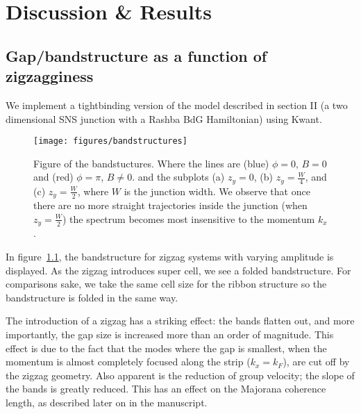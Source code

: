 \chapter{Discussion \& Results}
	
	\section{Gap/bandstructure as a function of zigzagginess}
		We implement a tightbinding version of the model described in section II (a two dimensional SNS junction with a Rashba BdG Hamiltonian) using Kwant.

		\begin{figure}[!htb]
		\texttt{[image: figures/bandstructures]}
		\caption{Figure of the bandstuctures.
		Where the lines are (blue) $\phi=0$, $B=0$ and (red) $\phi=\pi$, $B \ne 0$.
		and the subplots (a) $z_y=0$, (b) $z_y=\frac{W}{4}$, and (c) $z_y=\frac{W}{2}$, where $W$ is the junction width.
		We observe that once there are no more straight trajectories inside the junction (when $z_y=\frac{W}{2}$) the spectrum becomes most insensitive to the momentum $k_x$.
		\label{fig:bandstuctures}}
		\end{figure}

		In figure~\ref{fig:bandstuctures}, the bandstructure for zigzag systems with varying amplitude is displayed.
		As the zigzag introduces super cell, we see a folded bandstructure.
		For comparisons sake, we take the same cell size for the ribbon structure so the bandstructure is folded in the same way.

		The introduction of a zigzag has a striking effect: the bands flatten out, and more importantly, the gap size is increased more than an order of magnitude.
		This effect is due to the fact that the modes where the gap is smallest, when the momentum is almost completely focused along the strip ($k_x=k_F$), are cut off by the zigzag geometry.
		Also apparent is the reduction of group velocity; the slope of the bands is greatly reduced.
		This has an effect on the Majorana coherence length, as described later on in the manuscript.

